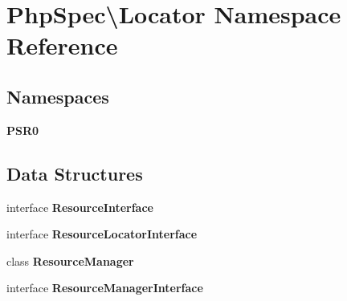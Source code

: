 \section{Php\+Spec\textbackslash{}Locator Namespace Reference}
\label{namespace_php_spec_1_1_locator}
\subsection*{Namespaces}
\begin{DoxyCompactItemize}
\item 
 {\bf P\+S\+R0}
\end{DoxyCompactItemize}
\subsection*{Data Structures}
\begin{DoxyCompactItemize}
\item 
interface {\bf Resource\+Interface}
\item 
interface {\bf Resource\+Locator\+Interface}
\item 
class {\bf Resource\+Manager}
\item 
interface {\bf Resource\+Manager\+Interface}
\end{DoxyCompactItemize}
